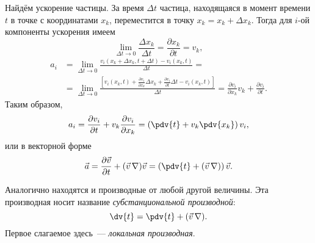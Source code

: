 Найдём ускорение частицы. За время $ \Delta t $ частица, находящаяся в момент времени $t$ в точке с координатами $ x_{k} $, переместится в точку $ x_{k}=x_{k}+\Delta x_{k} $. Тогда для $i$-ой компоненты ускорения имеем
\begin{equation}
\lim_{\Delta t \rightarrow 0} \frac{\Delta x_{k}}{\Delta t} =\frac{\partial x_{k}}{\partial t}=v_{k},
\end{equation}
\begin{equation}\begin{aligned}
	a_{i} &=\lim _{\Delta t \rightarrow 0} \frac{v_{i}\left(x_{k}+\Delta x_{k}, t+\Delta t\right)-v_{i}\left(x_{k}, t\right)}{\Delta t} = \\
	&=\lim _{\Delta t \rightarrow 0}\frac{\left[v_{i}\left(x_{k}, t\right)+\frac{\partial v_{i}}{\partial x_{k}} \Delta x_{k}+\frac{\partial v_{i}}{\partial t}\Delta t-v_{i}\left(x_{k}, t\right)\right]}{\Delta t} =\frac{\partial v_{i}}{\partial x_{k}} v_{k}+\frac{\partial v_{i}}{\partial t}.
\end{aligned}\end{equation}
Таким образом,
\begin{equation}
a_{i} =\frac{\partial v_{i}}{\partial t}+v_{k} \frac{\partial v_{i}}{\partial x_k}=\left(\pdv{t}+v_{k} \pdv{x_k}\right) v_{i},
\end{equation}
или в векторной форме
\begin{equation}
	\vec{a} =\frac{\partial \vec{v}}{\partial t}+(\vec{v}\,\nabla) \vec{v}=\left(\pdv{t}+(\vec{v}\,\nabla)\right) \vec{v}.
\end{equation}

Аналогично находятся и производные от любой другой величины. Эта производная носит название \textit{субстанциональной производной}:
\begin{equation}
\dv{t}=\pdv{t}+(\vec{v}\,\nabla).
\end{equation}
Первое слагаемое здесь~--- \textit{локальная производная}.


